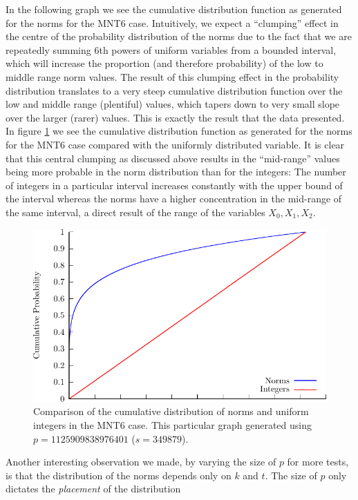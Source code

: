 \documentclass[a4paper, 12pt, envcountsect, runningheads]{llncs}
\numberwithin{figure}{section}
\numberwithin{equation}{section}
\begin{document}
In the following graph we see the cumulative distribution function as generated for the norms for the MNT6 case. Intuitively, we expect a ``clumping'' effect in the centre of the probability distribution of the norms due to the fact that we are repeatedly summing 6th powers of uniform variables from a bounded interval, which will increase the proportion (and therefore probability) of the low to middle range norm values. The result of this clumping effect in the probability distribution translates to a very steep cumulative distribution function over the low and middle range (plentiful) values, which tapers down to very small slope over the larger (rarer) values. This is exactly the result that the data presented. In figure \ref{fig:comp} we see the cumulative distribution function as generated for the norms for the MNT6 case compared with the uniformly distributed variable.
It is clear that this central clumping as discussed above results in the ``mid-range'' values being more probable in the norm distribution than for the integers: The number of integers in a particular interval increases constantly with the upper bound of the interval whereas the norms have a higher concentration in the mid-range of the same interval, a direct result of the range of the variables $X_0,X_1,X_2$. 
\begin{figure}\label{fig:comp}
\includegraphics[scale=1]{graphs/cumulative}\caption{Comparison of the cumulative distribution of norms and uniform integers in the MNT6 case. This particular graph generated using $p=1125909838976401$ ($s=349879$).}
\end{figure}
Another interesting observation we made, by varying the size of $p$ for more tests, is that the distribution of the norms depends only on $k$ and $t$. The size of $p$ only dictates the \textit{placement} of the distribution %
\end{document}
